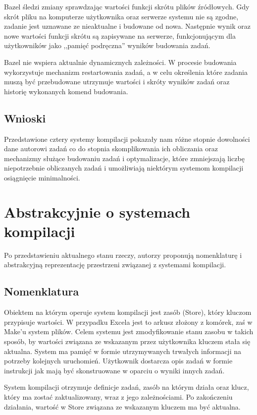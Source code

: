 Bazel śledzi zmiany sprawdzając wartości funkcji skrótu plików źródłowych. Gdy skrót pliku na komputerze użytkownika oraz serwerze systemu nie są zgodne, zadanie jest uznawane ze nieaktualne i budowane od nowa. Następnie wynik oraz nowe wartości funkcji skrótu są zapisywane na serwerze, funkcjonującym dla użytkowników jako ,,pamięć podręczna'' wyników budowania zadań.

Bazel nie wspiera aktualnie dynamicznych zależności. W procesie budowania wykorzystuje mechanizm restartowania zadań, a w celu określenia które zadania muszą być przebudowane utrzymuje wartości i skróty wyników zadań oraz historię wykonanych komend budowania.

\subsection{Wnioski}

Przedstawione cztery systemy kompilacji pokazały nam różne stopnie dowolności dane autorowi zadań co do stopnia skomplikowania ich obliczania oraz mechanizmy służące budowaniu zadań i optymalizacje, które zmniejszają liczbę niepotrzebnie obliczanych zadań i umożliwiają niektórym systemom kompilacji osiągnięcie minimalności.

\section{Abstrakcyjnie o systemach kompilacji}

Po przedstawieniu aktualnego stanu rzeczy, autorzy proponują nomenklaturę i abstrakcyjną reprezentację przestrzeni związanej z systemami kompilacji.

\subsection{Nomenklatura}

Obiektem na którym operuje system kompilacji jest zasób (Store), który kluczom przypisuje wartości. W przypadku Excela jest to arkusz złożony z komórek, zaś w Make'u system plików. Celem systemu jest zmodyfikowanie stanu zasobu w takich sposób, by wartości związana ze wskazanym przez użytkownika kluczem stała się aktualna. System ma pamięć w formie utrzymywanych trwałych informacji na potrzeby kolejnych uruchomień. Użytkownik dostarcza opis zadań w formie instrukcji jak mają być skonstruowane w oparciu o wyniki innych zadań.

System kompilacji otrzymuje definicje zadań, zasób na którym działa oraz klucz, który ma zostać zaktualizowany, wraz z jego zależnościami. Po zakończeniu działania, wartość w Store związana ze wskazanym kluczem ma być aktualna.

